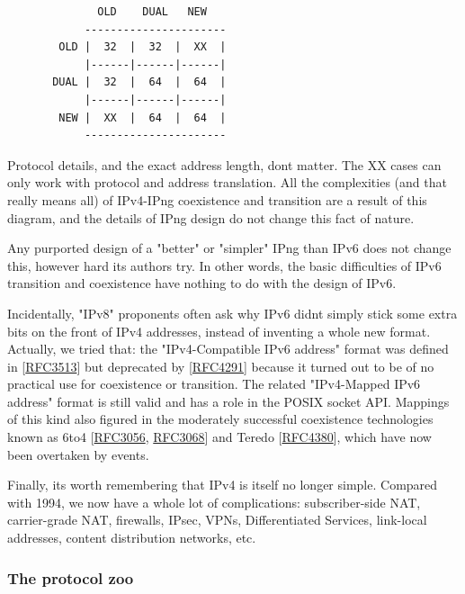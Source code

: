 \documentclass[
]{article}
\begin{document}
\begin{verbatim}
              OLD    DUAL   NEW     
            ----------------------
        OLD |  32  |  32  |  XX  |      
            |------|------|------|
       DUAL |  32  |  64  |  64  |
            |------|------|------|
        NEW |  XX  |  64  |  64  |
            ----------------------
\end{verbatim}

Protocol details, and the exact address length, don\textquotesingle t
matter. The XX cases can only work with protocol and address
translation. All the complexities (and that really means all) of
IPv4-IPng coexistence and transition are a result of this diagram, and
the details of IPng design do not change this fact of nature.

Any purported design of a "better" or "simpler" IPng than IPv6 does not
change this, however hard its authors try. In other words, the basic
difficulties of IPv6 transition and coexistence have nothing to do with
the design of IPv6.

Incidentally, "IPv8" proponents often ask why IPv6
didn\textquotesingle t simply stick some extra bits on the front of IPv4
addresses, instead of inventing a whole new format. Actually, we tried
that: the "IPv4-Compatible IPv6 address" format was defined in
{[}\href{https://www.rfc-editor.org/info/rfc3513}{RFC3513}{]} but
deprecated by
{[}\href{https://www.rfc-editor.org/info/rfc4291}{RFC4291}{]} because it
turned out to be of no practical use for coexistence or transition. The
related "IPv4-Mapped IPv6 address" format is still valid and has a role
in the POSIX socket API. Mappings of this kind also figured in the
moderately successful coexistence technologies known as 6to4
{[}\href{https://www.rfc-editor.org/info/rfc3056}{RFC3056},
\href{https://www.rfc-editor.org/info/rfc3068}{RFC3068}{]} and Teredo
{[}\href{https://www.rfc-editor.org/info/rfc4380}{RFC4380}{]}, which
have now been overtaken by events.

Finally, it\textquotesingle s worth remembering that IPv4 is itself no
longer simple. Compared with 1994, we now have a whole lot of
complications: subscriber-side NAT, carrier-grade NAT, firewalls, IPsec,
VPNs, Differentiated Services, link-local addresses, content
distribution networks, etc.

\subsubsection{The protocol zoo}\label{the-protocol-zoo}
\end{document}
